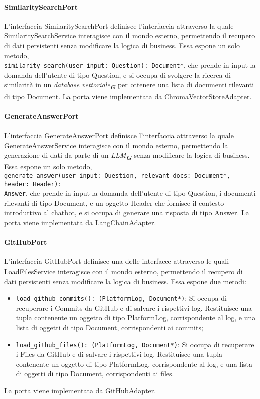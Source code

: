 \newpage


\label{sec:port}

\paragraph{SimilaritySearchPort}
\label{sec:similarity_search_port}
L'interfaccia SimilaritySearchPort definisce l'interfaccia attraverso la quale SimilaritySearchService interagisce con il mondo esterno, permettendo il recupero di dati persistenti senza modificare la logica di business. Essa espone un solo metodo,\\ \texttt{similarity\_search(user\_input: Question): Document*}, che prende in input la domanda dell'utente di tipo Question, e si occupa di svolgere la ricerca di similarità in un \emph{database vettoriale}\textsubscript{\textbf{\textit{G}}} per ottenere una lista di documenti rilevanti di tipo Document. La porta viene implementata da ChromaVectorStoreAdapter.

\paragraph{GenerateAnswerPort}
\label{sec:generate_answer_port}
L'interfaccia GenerateAnswerPort definisce l'interfaccia attraverso la quale GenerateAnswerService interagisce con il mondo esterno, permettendo la generazione di dati da parte di un \emph{LLM}\textsubscript{\textbf{\textit{G}}} senza modificare la logica di business. Essa espone un solo metodo,\\ \texttt{generate\_answer(user\_input: Question, relevant\_docs: Document*, header: Header):\\ Answer}, che prende in input la domanda dell'utente di tipo Question, i documenti rilevanti di tipo Document, e un oggetto Header che fornisce il contesto introduttivo al chatbot, e si occupa di generare una risposta di tipo Answer. La porta viene implementata da LangChainAdapter.

\paragraph{GitHubPort}
\label{sec:github_port}
L'interfaccia GitHubPort definisce una delle interfacce attraverso le quali LoadFilesService interagisce con il mondo esterno, permettendo il recupero di dati persistenti senza modificare la logica di business. Essa espone due metodi:
\begin{itemize}
    \item \texttt{load\_github\_commits(): (PlatformLog, Document*)}: Si occupa di recuperare i Commits da GitHub e di salvare i rispettivi log. Restituisce una tupla contenente un oggetto di tipo PlatformLog, corrispondente al log, e una lista di oggetti di tipo Document, corrispondenti ai commits;
    \item \texttt{load\_github\_files(): (PlatformLog, Document*)}: Si occupa di recuperare i Files da GitHub e di salvare i rispettivi log. Restituisce una tupla contenente un oggetto di tipo PlatformLog, corrispondente al log, e una lista di oggetti di tipo Document, corrispondenti ai files.
\end{itemize}
La porta viene implementata da GitHubAdapter.

